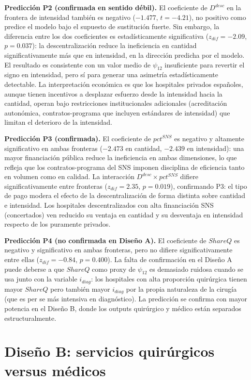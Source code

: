 \documentclass[12pt, a4paper, twoside, openright]{book}
\theoremstyle{plain}
\theoremstyle{definition}
\theoremstyle{remark}
\begin{document}
\textbf{Predicción P2 (confirmada en sentido débil).} El coeficiente de $D^{desc}$ en la frontera de intensidad también es negativo ($-1.477$, $t=-4.21$), no positivo como predice el modelo bajo el supuesto de sustitución fuerte. Sin embargo, la diferencia entre los dos coeficientes es estadísticamente significativa ($z_{dif}=-2.09$, $p=0.037$): la descentralización reduce la ineficiencia en cantidad significativamente más que en intensidad, en la dirección predicha por el modelo. El resultado es consistente con un valor medio de $\psi_{12}$ insuficiente para revertir el signo en intensidad, pero sí para generar una asimetría estadísticamente detectable. La interpretación económica es que los hospitales privados españoles, aunque tienen incentivos a desplazar esfuerzo desde la intensidad hacia la cantidad, operan bajo restricciones institucionales adicionales (acreditación autonómica, contratos-programa que incluyen estándares de intensidad) que limitan el deterioro de la intensidad.

\textbf{Predicción P3 (confirmada).} El coeficiente de $pct^{SNS}$ es negativo y altamente significativo en ambas fronteras ($-2.473$ en cantidad, $-2.439$ en intensidad): una mayor financiación pública reduce la ineficiencia en ambas dimensiones, lo que refleja que los contratos-programa del SNS imponen disciplina de eficiencia tanto en volumen como en calidad. La interacción $D^{desc}\times pct^{SNS}$ difiere significativamente entre fronteras ($z_{dif}=2.35$, $p=0.019$), confirmando P3: el tipo de pago modera el efecto de la descentralización de forma distinta sobre cantidad e intensidad. Los hospitales descentralizados con alta financiación SNS (concertados) ven reducido su ventaja en cantidad y su desventaja en intensidad respecto de los puramente privados.

\textbf{Predicción P4 (no confirmada en Diseño A).} El coeficiente de $ShareQ$ es negativo y significativo en ambas fronteras, pero no difiere significativamente entre ellas ($z_{dif}=-0.84$, $p=0.400$). La falta de confirmación en el Diseño A puede deberse a que $ShareQ$ como proxy de $\psi_{12}$ es demasiado ruidosa cuando se usa junto con la variable $i_{diag}$: los hospitales con alta proporción quirúrgica tienen mayor $ShareQ$ pero también mayor $i_{diag}$ por la propia naturaleza de la cirugía (que es per se más intensiva en diagnóstico). La predicción se confirma con mayor potencia en el Diseño B, donde los outputs quirúrgico y médico están separados estructuralmente.


\section{Diseño B: servicios quirúrgicos versus médicos}
\label{sec:res_B}
\end{document}

